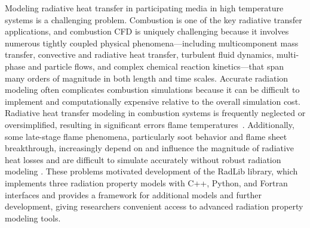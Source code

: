 \documentclass[preprint,12pt]{elsarticle}
\begin{document}
Modeling radiative heat transfer in participating media in high temperature systems is a challenging problem. Combustion is one of the key radiative transfer applications, and combustion CFD is uniquely challenging because it involves numerous tightly coupled physical phenomena---including multicomponent mass transfer, convective and radiative heat transfer, turbulent fluid dynamics, multi-phase and particle flows, and complex chemical reaction kinetics---that span many orders of magnitude in both length and time scales.
Accurate radiation modeling often complicates combustion simulations because it can be difficult to implement and computationally expensive relative to the overall simulation cost.
Radiative heat transfer modeling in combustion systems is frequently neglected or oversimplified, resulting in significant errors flame temperatures~\citep{Modest_2016}.
Additionally, some late-stage flame phenomena, particularly soot behavior and flame sheet breakthrough, increasingly depend on and influence the magnitude of radiative heat losses and are difficult to simulate accurately without robust radiation modeling \cite{Modest_2013}. These problems motivated development of the RadLib library, which implements three radiation property models with C++, Python, and Fortran interfaces and provides a framework for additional models and further development, giving researchers convenient access to advanced radiation property modeling tools.
\end{document}
